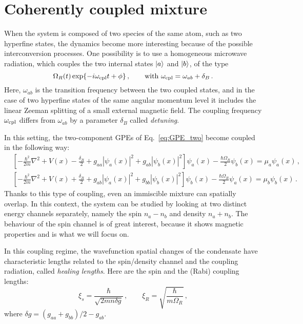\section{Coherently coupled mixture}
When the system is composed of two species of the same atom, such as two hyperfine states, the dynamics become more interesting because of the possible interconversion processes. One possibility is to use a homogeneous microwave radiation, which couples the two internal states $\ket{a}$ and $\ket{b}$, of the type
\begin{equation*}
    \Omega_R(t) \exp{-i\omega_{\rm cpl}t + \phi}\, ,\qquad \text{with }
    \omega_{\rm cpl} = \omega_{ab} + \delta_B\, .
\end{equation*}
Here, $\omega_{ab}$ is the transition frequency between the two coupled states, and in the case of two hyperfine states of the same angular momentum level it includes the linear Zeeman splitting of a small external magnetic field. The coupling frequency $\omega_{\rm cpl}$ differs from $\omega_{ab}$ by a parameter $\delta_B$ called \textit{detuning}.

In this setting, the two-component GPEs of Eq.\ \eqref{eq:GPE_two} become coupled in the following way:
\begin{equation}
    \begin{aligned}
        &\left[ -\frac{\hbar^2}{2m}\nabla^2 + V(x) - \frac{\delta_B}{2} + g_{aa}|\psi_a(x)|^2 + g_{ab}|\psi_b(x)|^2
        \right] \psi_a(x) - \frac{\hbar\Omega_R}{2}\psi_b(x) = \mu_a \psi_a(x)\, , \\
        &\left[ -\frac{\hbar^2}{2m}\nabla^2 + V(x) + \frac{\delta_B}{2} + g_{ab}|\psi_a(x)|^2 + g_{bb}|\psi_b(x)|^2
        \right] \psi_b(x) - \frac{\hbar\Omega_R}{2}\psi_a(x) = \mu_b \psi_b(x)\, .
    \end{aligned}
    \label{eq:GPE_coupled}
\end{equation}
Thanks to this type of coupling, even an immiscible mixture can spatially overlap. In this context, the system can be studied by looking at two distinct energy channels separately, namely the spin $n_a-n_b$ and density $n_a+n_b$. The behaviour of the spin channel is of great interest, because it shows magnetic properties and is what we will focus on. 

In this coupling regime, the wavefunction spatial changes of the condensate have characteristic lengths related to the spin/density channel and the coupling radiation, called \textit{healing lengths}. Here are the spin and the (Rabi) coupling lengths:
\begin{equation}
    \xi_s = \frac{\hbar}{\sqrt{2mn\delta g}}\, ,
    \qquad
    \xi_R = \sqrt{\frac{\hbar}{m\Omega_R}}\, ,
    \label{eq:heal}
\end{equation} 
where $\delta g = (g_{aa}+g_{bb})/2 - g_{ab}$.

